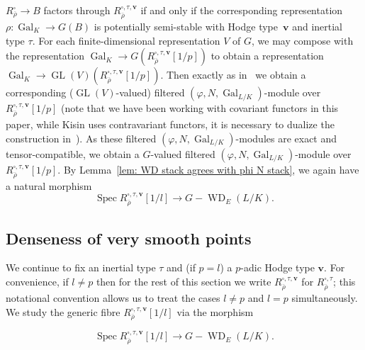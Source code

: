 \documentclass{amsart}
\theoremstyle{definition}
\theoremstyle{remark}
\def\numequation{\addtocounter{subsubsection}{1}\begin{equation}}
\newcommand{\mar}[1]{}
\newcommand{\mar}[1]{\marginpar{\raggedright\tiny squirrel #1}}
\DeclareMathOperator{\Gal}{Gal}
\DeclareMathOperator{\GL}{GL}
\DeclareMathOperator{\Spec}{Spec}
\DeclareMathOperator{\WD}{WD}
\newcommand{\rhobar}{\overline{\rho}}
\begin{document}
$R_{\rhobar}^{\square}\to B$ factors through
$R_{\rhobar}^{\square,\tau,\mathbf{v}}$ if and only if the
corresponding representation $\rho:\Gal_K\to G(B)$ is potentially semi-stable
with Hodge type~$\mathbf{v}$ and inertial type $\tau$. %
For each finite-dimensional representation $V$ of $G$, we may compose with
the representation $\Gal_K\rightarrow
G(R_{\rhobar}^{\square,\tau,\mathbf{v}}[1/p])$ to obtain a representation
$\Gal_K\rightarrow\GL(V)(R_{\rhobar}^{\square,\tau,\mathbf{v}}[1/p])$.
Then exactly as in~\cite[Thm.\ 2.5.5]{MR2373358} we obtain a
corresponding ($\GL(V)$-valued) filtered $(\varphi,N,\Gal_{L/K})$-module over
$R_{\rhobar}^{\square,\tau,\mathbf{v}}[1/p]$ (note that we have been working
with covariant functors in this paper, while Kisin uses contravariant
functors, it is necessary to dualize the
construction in~\cite[]{MR2373358}). %
As these
filtered $(\varphi,N,\Gal_{L/K})$-modules are exact and
tensor-compatible, we obtain a $G$-valued filtered
$(\varphi,N,\Gal_{L/K})$-module over
$R_{\rhobar}^{\square,\tau,\mathbf{v}}[1/p]$.  By Lemma~\ref{lem: WD stack agrees with phi N stack}, we again have a natural
morphism %
\[ \Spec R_{\rhobar}^{\square,\tau,\mathbf{v}}[1/l]\to G-\WD_E(L/K). \]


\subsection{Denseness of very smooth points}

We continue to fix an inertial type $\tau$ and (if $p=l$) a $p$-adic Hodge type $\mathbf{v}$.  For convenience, if $l\ne p$ then for the rest of this section
we write $R_{\rhobar}^{\square,\tau,\mathbf{v}}$ for
$R_{\rhobar}^{\square,\tau}$; this notational convention allows us to
treat the cases $l\ne p$ and $l=p$ simultaneously. We study the
generic fibre $R_{\rhobar}^{\square,\tau,\mathbf{v}}[1/l]$ via the
morphism \numequation\label{eqn:morphism from deformation ring to WD
  stack} \Spec R_{\rhobar}^{\square,\tau,\mathbf{v}}[1/l]\to
  G-\WD_E(L/K). \end{equation}
\end{document}
